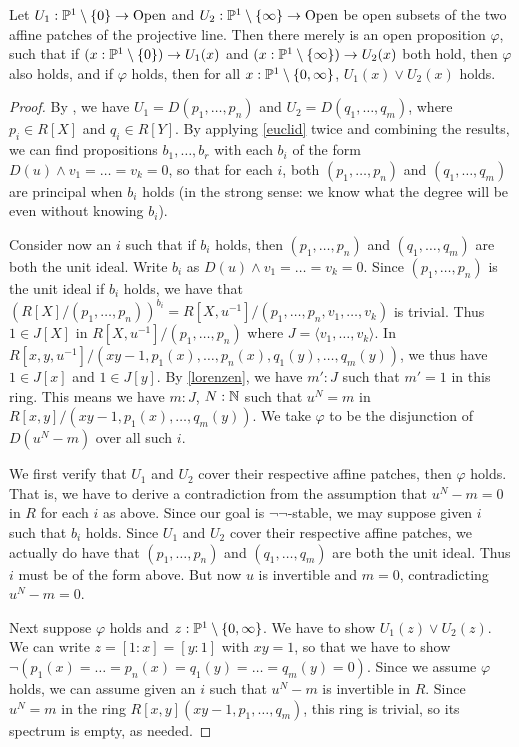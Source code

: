 \begin{lemma}\label{elim-xy}
  Let $U_1 : \mathbb{P}^1\setminus\{0\} \to \mathrm{Open}$ and
  $U_2 : \mathbb{P}^1\setminus\{\infty\} \to \mathrm{Open}$ be open subsets of the two affine patches
  of the projective line.
  Then there merely is an open proposition $\varphi$, such that
  if $(x : \mathbb{P}^1\setminus\{0\}) \to U_1(x)$ and
  $(x : \mathbb{P}^1\setminus\{\infty\}) \to U_2(x)$ both hold, then $\varphi$ also holds,
  and if $\varphi$ holds, then for all $x : \mathbb{P}^1\setminus\{0,\infty\}$,
  $U_1(x) \vee U_2(x)$ holds.
\end{lemma}
\begin{proof}
  By \cite[Theorem 4.2.7]{draft}, we have $U_1 = D(p_1,\ldots,p_n)$ and
  $U_2 = D(q_1,\ldots,q_m)$, where $p_i \in R[X]$ and $q_i \in R[Y]$.
  By applying \cref{euclid} twice and combining the results, 
  we can find propositions
  $b_1,\ldots,b_r$ with each $b_i$ of the form
  $D(u) \wedge v_1 = \ldots = v_k = 0$,
  so that for each $i$, both $(p_1,\ldots,p_n)$ 
  and $(q_1,\ldots,q_m)$ are principal when $b_i$ holds
  (in the strong sense: we know what the degree will be even without knowing $b_i$).
 
  Consider now an $i$ such that if $b_i$ holds, then
  $(p_1,\ldots,p_n)$ and $(q_1,\ldots,q_m)$ are both the unit ideal.
  Write $b_i$ as $D(u) \wedge v_1 = \ldots = v_k = 0$.
  Since $(p_1,\ldots,p_n)$ is the unit ideal if $b_i$ holds,
  we have that $(R[X]/(p_1,\ldots,p_n))^{b_i} = R[X,u^{-1}]/(p_1,\ldots,p_n,v_1,\ldots,v_k)$
  is trivial.
  Thus $1 \in J[X]$ in $R[X,u^{-1}]/(p_1,\ldots,p_n)$
  where $J = \langle v_1,\ldots,v_k\rangle$.
  In $R[x,y,u^{-1}]/(xy-1,p_1(x),\ldots,p_n(x),q_1(y),\ldots,q_m(y))$,
  we thus have $1 \in J[x]$ and $1 \in J[y]$.
  By \cref{lorenzen}, we have $m' : J$ such that $m' = 1$ in
  this ring.
  This means we have $m : J$, $N : \mathbb{N}$ such that $u^N = m$
  in $R[x,y]/(xy-1,p_1(x),\ldots,q_m(y))$.
  We take $\varphi$ to be the disjunction of
  $D(u^N-m)$ over all such $i$.

  We first verify that $U_1$ and $U_2$ cover their respective
  affine patches, then $\varphi$ holds.
  That is, we have to derive a contradiction from the assumption
  that $u^N-m = 0$ in $R$ for each $i$ as above.
  Since our goal is $\neg \neg$-stable, we may suppose given $i$
  such that $b_i$ holds. 
	Since $U_1$ and $U_2$ cover their respective affine patches,
	we actually do have that $(p_1,\ldots,p_n)$ and $(q_1,\ldots,q_m)$
	are both the unit ideal. Thus $i$ must be of the form above.
	But now $u$ is invertible and $m = 0$, contradicting $u^N-m = 0$.

	Next suppose $\varphi$ holds and $z : \mathbb{P}^1 \setminus \{0,\infty\}$.
	We have to show $U_1(z) \vee U_2(z)$.
	We can write $z = [1 : x] = [y : 1]$ with $xy = 1$, so that
	we have to show
	$\neg (p_1(x) = \ldots = p_n(x) = q_1(y) = \ldots = q_m(y) = 0)$.
	Since we assume $\varphi$ holds, we can assume given an $i$
	such that $u^N - m$ is invertible in $R$.
	Since $u^N = m$ in
	the ring $R[x,y](xy-1,p_1,\ldots,q_m)$, this ring is trivial,
	so its spectrum is empty, as needed.
\end{proof}

